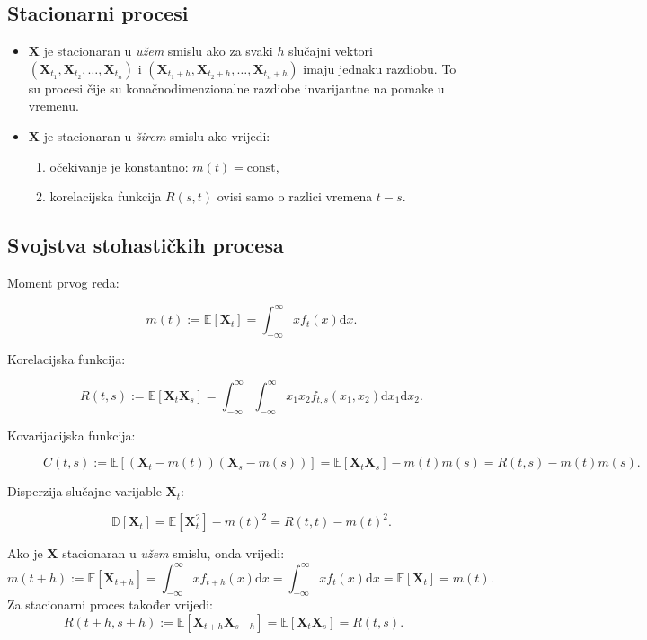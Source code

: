 \documentclass[12pt,english]{article}
\begin{document}
\subsection{Stacionarni procesi}
\begin{itemize}
  \item $\mathbf X$ je stacionaran u \emph{užem} smislu ako za svaki $h$ slučajni vektori $\left( \mathbf X_{t_1}, \mathbf X_{t_2}, \ldots, \mathbf X_{t_n}\right)$ i  $\left( \mathbf X_{t_1+h}, \mathbf X_{t_2+h}, \ldots, \mathbf X_{t_n+h}\right)$ imaju jednaku razdiobu. To su procesi čije su konačnodimenzionalne razdiobe invarijantne na pomake u vremenu.

  \item $\mathbf X$ je stacionaran u \emph{širem} smislu ako vrijedi:
  \begin{enumerate}
    \item očekivanje je konstantno: $m(t) = \text{const}$,
    \item korelacijska funkcija $R(s,t)$ ovisi samo o razlici vremena $t-s$.
  \end{enumerate}
\end{itemize}

\subsection{Svojstva stohastičkih procesa}
\begin{description}
  \item[Moment prvog reda:]
  $$m(t) := \mathbb E\left[ \mathbf X_t\right] = \int_{-\infty}^\infty xf_t(x)\mathrm{d}x.$$
  \item[Korelacijska funkcija:]
  $$R(t,s) := \mathbb E\left[\mathbf X_t \mathbf X_s\right] = \int_{-\infty}^\infty \int_{-\infty}^\infty x_1x_2f_{t,s}(x_1,x_2)\mathrm dx_1\mathrm dx_2.$$
  \item[Kovarijacijska funkcija:]
  $$C(t,s) := \mathbb E\left[(\mathbf X_t - m(t))(\mathbf X_s-m(s))\right] = \mathbb E\left[\mathbf X_t\mathbf X_s\right] -m(t)m(s) = R(t,s)-m(t)m(s).$$
  \item[Disperzija slučajne varijable $\mathbf X_t$:]
  $$\mathbb D\left[\mathbf X_t\right] = \mathbb E\left[\mathbf X_t^2\right] - m(t)^2 = R(t,t) - m(t)^2.$$
\end{description}
Ako je $\mathbf X$ stacionaran u \emph{užem} smislu, onda vrijedi:
  $$m(t+h) := \mathbb E\left[ \mathbf X_{t+h}\right] = \int_{-\infty}^\infty xf_{t+h}(x)\mathrm{d}x = \int_{-\infty}^\infty xf_{t}(x)\mathrm{d}x = \mathbb E\left[\mathbf X_t\right] = m(t).$$
Za stacionarni proces također vrijedi:
$$R(t+h,s+h) := \mathbb E\left[\mathbf X_{t+h} \mathbf X_{s+h}\right] = \mathbb E\left[\mathbf X_t \mathbf X_s\right] = R(t,s).$$
\end{document}
